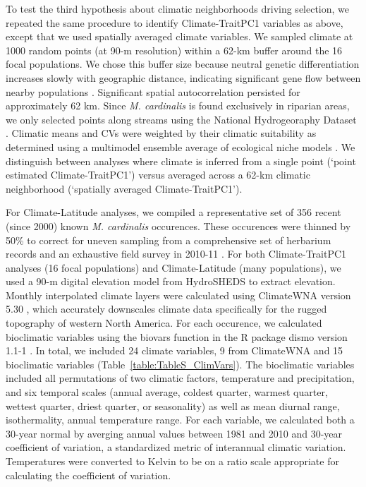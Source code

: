 \documentclass[11pt, oneside]{article}
\newcommand{\pkg}[1]{{\fontseries{b}\selectfont #1}}
\begin{document}
To test the third hypothesis about climatic neighborhoods driving selection, we repeated the same procedure to identify Climate-TraitPC1 variables as above, except that we used spatially averaged climate variables. We sampled climate at 1000 random points (at 90-m resolution) within a 62-km buffer around the 16 focal populations. We chose this buffer size because neutral genetic differentiation increases slowly with geographic distance, indicating significant gene flow between nearby populations \citep{Paul_etal_2016}. Significant spatial autocorrelation persisted for approximately 62 km. Since \textit{M. cardinalis} is found exclusively in riparian areas, we only selected points along streams using the National Hydrogeoraphy Dataset \citep{NHD}. Climatic means and CVs were weighted by their climatic suitability as determined using a multimodel ensemble average of ecological niche models \citep{Angert_ENM}. We distinguish between analyses where climate is inferred from a single point (`point estimated Climate-TraitPC1') versus averaged across a 62-km climatic neighborhood (`spatially averaged Climate-TraitPC1'). 


For Climate-Latitude analyses, we compiled a representative set of 356 recent (since 2000) known \textit{M. cardinalis} occurences. These occurences were thinned by 50\% to correct for uneven sampling from a comprehensive set of herbarium records and an exhaustive field survey in 2010-11 \citep{Angert_ENM}. For both Climate-TraitPC1 analyses (16 focal populations) and Climate-Latitude (many populations), we used a 90-m digital elevation model from HydroSHEDS \citep{Lehner_etal_2006} to extract elevation. Monthly interpolated climate layers were calculated using ClimateWNA version 5.30 \citep{Wang_etal_2012}, which accurately downscales climate data specifically for the rugged topography of western North America. For each occurence, we calculated bioclimatic variables using the biovars function in the R package \pkg{dismo} version 1.1-1 \citep{Hijmans_etal_2016}. In total, we included 24 climate variables, 9 from ClimateWNA and 15 bioclimatic variables (Table~\ref{table:TableS_ClimVars}). The bioclimatic variables included all permutations of two climatic factors, temperature and precipitation, and six temporal scales (annual average, coldest quarter, warmest quarter, wettest quarter, driest quarter, or seasonality) as well as mean diurnal range, isothermality, annual temperature range. For each variable, we calculated both a 30-year normal by averging annual values between 1981 and 2010 and 30-year coefficient of variation, a standardized metric of interannual climatic variation. Temperatures were converted to Kelvin to be on a ratio scale appropriate for calculating the coefficient of variation. 
\end{document}
